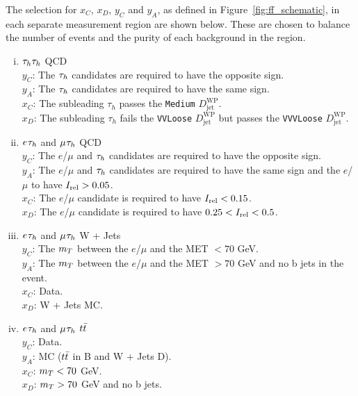 The selection for $x_C$, $x_D$, $y_C$ and $y_A$, as defined in Figure~\ref{fig:ff_schematic}, in each separate measurement region are shown below.
These are chosen to balance the number of events and the purity of each background in the region.

\begin{enumerate}[i)]
   \item $\tau_{h}\tau_{h}$ \ac{QCD} \\
     \indent $y_C$: The $\tau_{h}$ candidates are required to have the opposite sign. \\
     \indent $y_A$: The $\tau_{h}$ candidates are required to have the same sign. \\
     \indent $x_C$: The subleading $\tau_h$ passes the \texttt{Medium} $D_{\text{jet}}^{\text{WP}}$. \\
     \indent $x_D$: The subleading $\tau_h$ fails the \texttt{VVLoose} $D_{\text{jet}}^{\text{WP}}$ but passes the \texttt{VVVLoose} $D_{\text{jet}}^{\text{WP}}$.
  \item $e_{}\tau_{h}$ and $\mu_{}\tau_{h}$ \ac{QCD} \\
    \indent $y_C$: The $e$/$\mu$ and $\tau_{h}$ candidates are required to have the opposite sign. \\
    \indent $y_A$: The $e$/$\mu$ and $\tau_{h}$ candidates are required to have the same sign and the $e$/$\mu$ to have $I_{\text{rel}}>0.05$. \\
    \indent $x_C$: The $e$/$\mu$ candidate is required to have $I_{\text{rel}}<0.15$. \\
    \indent $x_D$: The $e$/$\mu$ candidate is required to have $0.25<I_{\text{rel}}<0.5$.
  \item $e_{}\tau_{h}$ and $\mu_{}\tau_{h}$ W + Jets \\
    \indent $y_C$: The $m_{T}$ between the $e$/$\mu$ and the \ac{MET} $< 70$ GeV. \\
    \indent $y_A$: The $m_{T}$ between the $e$/$\mu$ and the \ac{MET} $> 70$ GeV and no b jets in the event. \\
    \indent $x_C$: Data. \\
    \indent $x_D$: W + Jets \ac{MC}.
  \item $e_{}\tau_{h}$ and $\mu_{}\tau_{h}$ $t\bar{t}$ \\
    \indent $y_C$: Data. \\
    \indent $y_A$: \ac{MC} ($t\bar{t}$ in B and W + Jets D). \\
    \indent $x_C$: $m_{T} < 70$ GeV. \\
    \indent $x_D$: $m_{T} > 70$ GeV and no b jets. \\
\end{enumerate}


